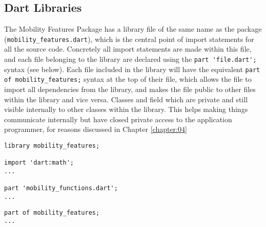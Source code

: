 \subsection{Dart Libraries}
The Mobility Features Package has a library file of the same name as the package (\verb|mobility_features.dart|), which is the central point of import statements for all the source code. Concretely all import statements are made within this file, and each file belonging to the library are declared using the \verb|part 'file.dart';| syntax (see below). Each file included in the library will have the equivalent \verb|part of mobility_features;| syntax at the top of their file, which allows the file to import all dependencies from the library, and makes the file public to other files within the library and vice versa. Classes and field which are private and still visible internally to other classes within the library. This helps making things communicate internally but have closed private access to the application programmer, for reasons discussed in Chapter \ref{chapter:04}

\begin{verbatim}
library mobility_features;

import 'dart:math';
...

part 'mobility_functions.dart';
...
\end{verbatim}

\begin{verbatim}
part of mobility_features;
...
\end{verbatim}

